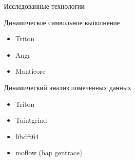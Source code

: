 \documentclass[10pt]{beamer}
\begin{document}

\begin{frame}{Исследованные технологии}
  \begin{block}{Динамическое символьное выполнение}
    \begin{itemize}
      \item Triton
      \item Angr
      \item Manticore
    \end{itemize}
  \end{block}
    \begin{block}{Динамический анализ помеченных данных}
    \begin{itemize}
      \item Triton 
      \item Taintgrind
      \item libdft64
      \item moflow (bap gentrace)
    \end{itemize}
  \end{block}
\end{frame}
\end{document}
